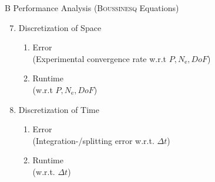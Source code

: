 \documentclass[10pt,a4paper]{article}
\begin{document}
B Performance Analysis (\textsc{Boussinesq} Equations)
\begin{enumerate}\setcounter{enumi}{6}
\item Discretization of Space
\begin{enumerate}
\item Error \\ (Experimental convergence rate w.r.t $P, N_\text{e}, DoF$)
\item Runtime \\ (w.r.t $P, N_\text{e}, DoF$)
\end{enumerate}
\item Discretization of Time
\begin{enumerate}
\item Error \\ (Integration-/splitting error w.r.t. $\Delta t$)
\item Runtime \\ (w.r.t. $\Delta t$)
\end{enumerate}
\end{enumerate}
\end{document}
